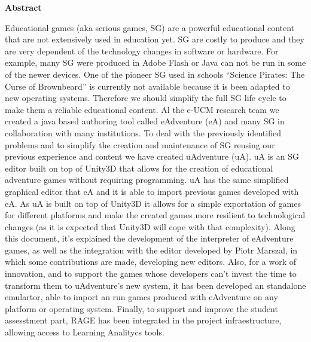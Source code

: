 
\newpage

\thispagestyle{empty}

\begin{center}

{\bf \Huge Abstract}

  \end{center}
\vspace{1cm}

Educational games (aka serious games, SG) are a powerful educational content that are not extensively used in education yet. SG are costly to produce and they are very dependent of the technology changes in software or hardware. For example, many SG were produced in Adobe Flash or Java can not be run in some of the newer devices. One of the pioneer SG used in schools “Science Pirates: The Curse of Brownbeard” is currently not available because it is been adapted to new operating systems. Therefore we should simplify the full SG life cycle to make them a reliable educational content. Al the e-UCM research team we created a java based authoring tool called eAdventure (eA) and many SG in collaboration with many institutions. To deal with the previously identified problems and to simplify the creation and maintenance of SG reusing our previous experience and content we have created uAdventure (uA). uA is an SG editor built on top of Unity3D that allows for the creation of educational adventure games without requiring programming. uA has the same simplified graphical editor that eA and it is able to import previous games developed with eA. As uA is built on top of Unity3D it allows for a simple exportation of games for different platforms and make the created games more resilient to technological changes (as it is expected that Unity3D will cope with that complexity).
Along this document, it's explained the development of the interpreter of eAdventure games, as well as the integration with the editor developed by Piotr Marszal, in which some contributions are made, developing new editors. Also, for a work of innovation, and to support the games whose developers can't invest the time to transform them to uAdventure's new system, it has been developed an standalone emulartor, able to import an run games produced with eAdventure on any platform or operating system. Finally, to support and improve the student assesstment part, RAGE has been integrated in the project infraestructure, allowing access to Learning Analitycs tools.

